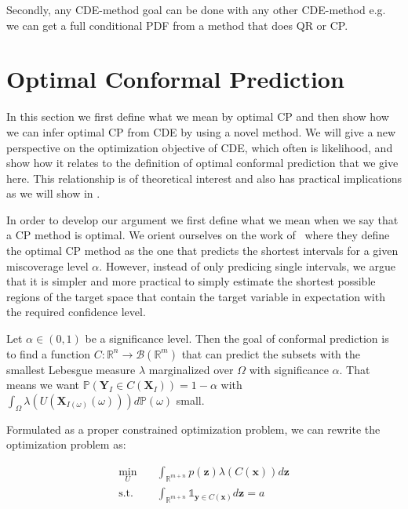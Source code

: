 Secondly, any CDE-method goal can be done with any other CDE-method e.g. we can get a full conditional PDF from a method that does QR or CP.


\section{Optimal Conformal Prediction}\label{sec:optimal_cp}

In this section we first define what we mean by optimal CP and then show how we can infer optimal CP from CDE by using a novel method. We will give a new perspective on the optimization objective of CDE, which often is likelihood, and show how it relates to the definition of optimal conformal prediction that we give here. This relationship is of theoretical interest and also has practical implications as we will show in . %

In order to develop our argument we first define what we mean when we say that a CP method is optimal. We orient ourselves on the work of~\cite{sesia2021conformal} where they define the optimal CP method as the one that predicts the shortest intervals for a given miscoverage level $\alpha$. However, instead of only predicing single intervals, we argue that it is simpler and more practical to simply estimate the shortest possible regions of the target space that contain the target variable in expectation with the required confidence level.

Let $\alpha \in (0,1)$ be a significance level. Then the goal of conformal prediction is to find a function $C : \mathbb{R}^n \to \mathcal{B}(\mathbb{R}^m)$ that can predict the subsets with the smallest Lebesgue measure $\lambda$ marginalized over $\Omega$ with significance $\alpha$. That means we want $\mathbb{P}(\mathbf{Y}_I \in C(\mathbf{X}_I)) = 1 - \alpha$ with $\int_{\Omega}\lambda(U(\mathbf{X}_{I(\omega)}(\omega))) d\mathbb{P}(\omega)$ small.

Formulated as a proper constrained optimization problem, we can rewrite the optimization problem as:

\begin{align}
    \min_U \quad      & \int_{\mathbb{R}^{m + n}} p(\mathbf{z})
    \lambda(C(\mathbf{x}))
    d\mathbf{z}
    \\
    \text{s.t.} \quad & \int_{\mathbb{R}^{m + n}} \mathds{1}_{\mathbf{y} \in
    C(\mathbf{x})} d\mathbf{z} = a
\end{align}



